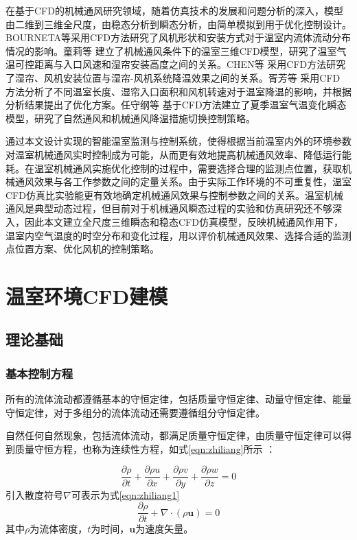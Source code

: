 在基于CFD的机械通风研究领域，随着仿真技术的发展和问题分析的深入，模型由二维到三维全尺度，由稳态分析到瞬态分析，由简单模拟到用于优化控制设计。BOURNETA等\supercite{Bournet2010}采用CFD方法研究了风机形状和安装方式对于温室内流体流动分布情况的影响。童莉等\supercite{TongLi2003} 建立了机械通风条件下的温室三维CFD模型，研究了温室气温可控距离与入口风速和湿帘安装高度之间的关系。CHEN等\supercite{Chen2014} 采用CFD方法研究了湿帘、风机安装位置与湿帘-风机系统降温效果之间的关系。胥芳等\supercite{XuFang2015} 采用CFD 方法分析了不同温室长度、湿帘入口面积和风机转速对于温室降温的影响，并根据分析结果提出了优化方案。任守纲等\supercite{RenShougang2015} 基于CFD方法建立了夏季温室气温变化瞬态模型，研究了自然通风和机械通风降温措施切换控制策略。

通过本文设计实现的智能温室监测与控制系统，使得根据当前温室内外的环境参数对温室机械通风实时控制成为可能，从而更有效地提高机械通风效率、降低运行能耗。在温室机械通风实施优化控制的过程中，需要选择合理的监测点位置，获取机械通风效果与各工作参数之间的定量关系。由于实际工作环境的不可重复性，温室CFD仿真比实验能更有效地确定机械通风效果与控制参数之间的关系。温室机械通风是典型动态过程，但目前对于机械通风瞬态过程的实验和仿真研究还不够深入，因此本文建立全尺度三维瞬态和稳态CFD仿真模型，反映机械通风作用下，温室内空气温度的时空分布和变化过程，用以评价机械通风效果、选择合适的监测点位置方案、优化风机的控制策略。


\section{温室环境CFD建模}
	\subsection{理论基础}
		\subsubsection{基本控制方程}
所有的流体流动都遵循基本的守恒定律，包括质量守恒定律、动量守恒定律、能量守恒定律，对于多组分的流体流动还需要遵循组分守恒定律。

自然任何自然现象，包括流体流动，都满足质量守恒定律，由质量守恒定律可以得到质量守恒方程，也称为连续性方程，如式\ref{eqn:zhiliang}所示\supercite{ComsolCfd2015,WangFujun2004} ：

	\begin{equation}
		\label{eqn:zhiliang}
		\frac{\partial\rho}{\partial t}+\frac{\partial \rho u}{\partial x}+\frac{\partial \rho v}{\partial y}+\frac{\partial \rho w}{\partial z}=0
	\end{equation}
引入散度符号$\nabla$可表示为式\ref{eqn:zhiliang1}
	\begin{equation}
		\label{eqn:zhiliang1}
		\frac{\partial\rho}{\partial t}+\nabla \cdot (\rho \mathbf{u}) =0
	\end{equation}
其中$\rho$为流体密度，$t$为时间，$\mathbf{u}$为速度矢量。

